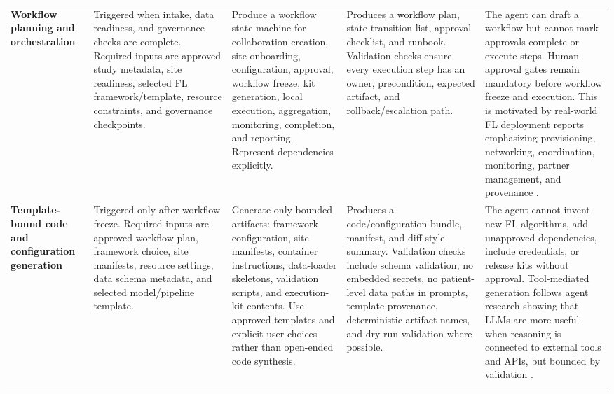 \documentclass[preprint,5p, 10pt, times]{elsarticle}
\begin{document}
\begin{table}[t]
\begin{tabularx}{\textwidth}{
>{\raggedright\arraybackslash}p{2.4cm}
>{\raggedright\arraybackslash}p{2.7cm}
>{\raggedright\arraybackslash}X
>{\raggedright\arraybackslash}X
>{\raggedright\arraybackslash}X}
\textbf{Workflow planning and orchestration}
& Triggered when intake, data readiness, and governance checks are complete. Required inputs are approved study metadata, site readiness, selected FL framework/template, resource constraints, and governance checkpoints.
& Produce a workflow state machine for collaboration creation, site onboarding, configuration, approval, workflow freeze, kit generation, local execution, aggregation, monitoring, completion, and reporting. Represent dependencies explicitly.
& Produces a workflow plan, state transition list, approval checklist, and runbook. Validation checks ensure every execution step has an owner, precondition, expected artifact, and rollback/escalation path.
& The agent can draft a workflow but cannot mark approvals complete or execute steps. Human approval gates remain mandatory before workflow freeze and execution. This is motivated by real-world FL deployment reports emphasizing provisioning, networking, coordination, monitoring, partner management, and provenance \cite{schoenpflug2025navigating,schlegel2026lowering,peltonen2026federated}. \\
\addlinespace[3pt]

\textbf{Template-bound code and configuration generation}
& Triggered only after workflow freeze. Required inputs are approved workflow plan, framework choice, site manifests, resource settings, data schema metadata, and selected model/pipeline template.
& Generate only bounded artifacts: framework configuration, site manifests, container instructions, data-loader skeletons, validation scripts, and execution-kit contents. Use approved templates and explicit user choices rather than open-ended code synthesis.
& Produces a code/configuration bundle, manifest, and diff-style summary. Validation checks include schema validation, no embedded secrets, no patient-level data paths in prompts, template provenance, deterministic artifact names, and dry-run validation where possible.
& The agent cannot invent new FL algorithms, add unapproved dependencies, include credentials, or release kits without approval. Tool-mediated generation follows agent research showing that LLMs are more useful when reasoning is connected to external tools and APIs, but bounded by validation \cite{yao2023react,schick2023toolformer,nist2023airmf}. \\
\addlinespace[3pt]


\end{tabularx}
\end{table}
\end{document}
